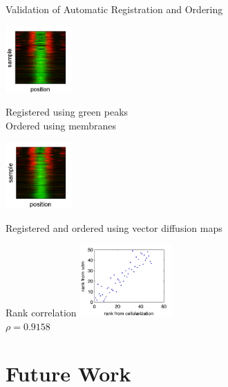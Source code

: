 \documentclass[10pt]{beamer}
\begin{document}
\begin{frame}{Validation of Automatic Registration and Ordering}
\begin{minipage}{3.1in}
\begin{minipage}{1.3in}
\centering
\includegraphics[width=1in]{fig6b}\\
{\scriptsize Registered using green peaks \\
Ordered using membranes \par}
\end{minipage}
%
\begin{minipage}{1.3in}
\centering
\includegraphics[width=1in]{fig6c}\\
{\scriptsize Registered and ordered using vector diffusion maps \par}
\end{minipage}
\end{minipage}
\hfill
\begin{minipage}{1.5in}
\centering
Rank correlation
\includegraphics[width=1.4in]{rank_corr_vdm}\\
$\rho=0.9158$
\end{minipage}

\end{frame}

\section{Future Work}
\end{document}
